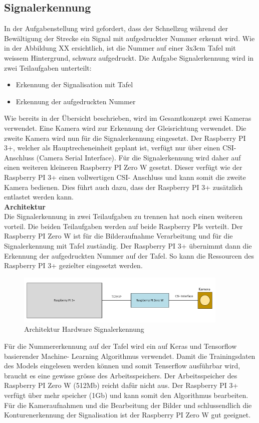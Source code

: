 \documentclass[../../main.tex]{subfiles}
\begin{document}
\subsection{Signalerkennung}
    In der Aufgabenstellung wird gefordert, dass der Schnellzug während der Bewältigung der Strecke ein Signal mit aufgedruckter Nummer erkennt wird. Wie in der Abbildung XX ersichtlich, ist die Nummer auf einer 3x3cm Tafel mit weissem Hintergrund, schwarz aufgedruckt. Die Aufgabe Signalerkennung wird in zwei Teilaufgaben unterteilt:
    \begin{itemize}
        \item Erkennung der Signalisation mit Tafel
        \item Erkennung der aufgedruckten Nummer
    \end{itemize}
    Wie bereits in der Übersicht beschrieben, wird im Gesamtkonzept zwei Kameras verwendet. Eine Kamera wird zur Erkennung der Gleisrichtung verwendet. Die zweite Kamera wird nun für die Signalerkennung eingesetzt. Der Raspberry PI 3+, welcher als Hauptrecheneinheit geplant ist, verfügt nur über einen CSI- Anschluss (Camera Serial Interface). Für die Signalerkennung wird daher auf einen weiteren kleineren Raspberry PI Zero W gesetzt. Dieser verfügt wie der Raspberry PI 3+ einen vollwertigen CSI- Anschluss und kann somit die zweite Kamera bedienen. Dies führt auch dazu, dass der Raspberry PI 3+ zusätzlich entlastet werden kann.\\

    \textbf{Architektur}\\
    Die Signalerkennung in zwei Teilaufgaben zu trennen hat noch einen weiteren vorteil. Die beiden Teilaufgaben werden auf beide Raspberry PIs verteilt. Der Raspberry PI Zero W ist für die Bilderaufnahme Verarbeitung und für die Signalerkennung mit Tafel zuständig. Der Raspberry PI 3+ übernimmt dann die Erkennung der aufgedruckten Nummer auf der Tafel. So kann die Ressourcen des Raspberry PI 3+ gezielter eingesetzt werden.

    \begin{figure}[H] %
        \centering
        \includegraphics[width=0.9\textwidth]{Architektur.png}
        \caption{Architektur Hardware Signalerkennung}
        \label{fig:architektur_hardware_signalerkennung}
    \end{figure}

    Für die Nummererkennung auf der Tafel wird ein auf Keras und Tensorflow basierender Machine- Learning Algorithmus verwendet. Damit die Trainingsdaten des Models eingelesen werden können und somit Tenserflow ausführbar wird, braucht es eine gewisse grösse des Arbeitsspeichers. Der Arbeitsspeicher des Raspberry PI Zero W (512Mb) reicht dafür nicht aus. Der Raspberry PI 3+ verfügt über mehr speicher (1Gb) und kann somit den Algorithmus bearbeiten. Für die Kameraufnahmen und die Bearbeitung der Bilder und schlussendlich die Konturenerkennung der Signalisation ist der Raspberry PI Zero W gut geeignet. 
\end{document}
